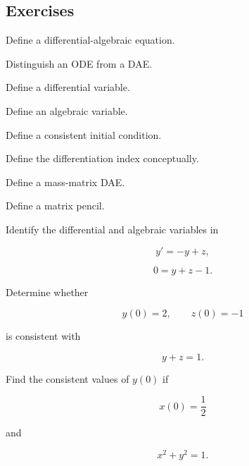 \subsection{Exercises}
\label{subsec:dae-exercises}

\begin{exercise}[1]
Define a differential-algebraic equation.
\end{exercise}

\begin{exercise}[1]
Distinguish an ODE from a DAE.
\end{exercise}

\begin{exercise}[1]
Define a differential variable.
\end{exercise}

\begin{exercise}[1]
Define an algebraic variable.
\end{exercise}

\begin{exercise}[1]
Define a consistent initial condition.
\end{exercise}

\begin{exercise}[1]
Define the differentiation index conceptually.
\end{exercise}

\begin{exercise}[1]
Define a mass-matrix DAE.
\end{exercise}

\begin{exercise}[1]
Define a matrix pencil.
\end{exercise}

\begin{exercise}[2]
Identify the differential and algebraic variables in

\[
y'=-y+z,
\]

\[
0=y+z-1.
\]
\end{exercise}

\begin{exercise}[2]
Determine whether

\[
y(0)=2,
\qquad
z(0)=-1
\]

is consistent with

\[
y+z=1.
\]
\end{exercise}

\begin{exercise}[2]
Find the consistent values of \(y(0)\) if

\[
x(0)=\frac12
\]

and

\[
x^2+y^2=1.
\]
\end{exercise}


